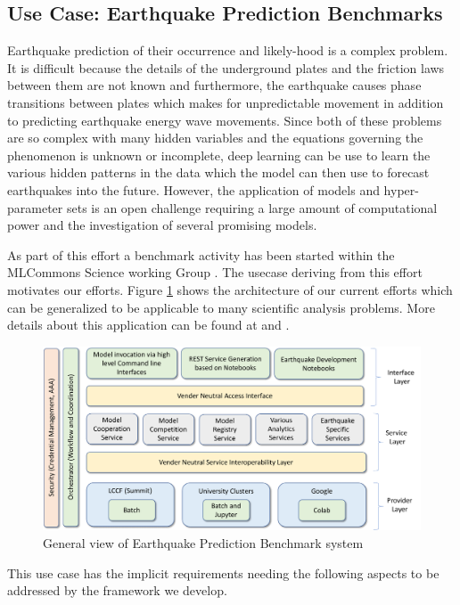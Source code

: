 \subsection{Use Case: Earthquake Prediction Benchmarks}


Earthquake prediction of their occurrence and likely-hood is a complex problem. 
It is difficult because the details of
the underground plates and the friction laws between them are not
known and furthermore, the earthquake causes phase transitions between
plates which makes for unpredictable movement in addition to 
predicting earthquake energy wave movements. 
Since both of these problems
are so complex with many hidden variables and the equations governing
the phenomenon is unknown or incomplete, deep learning can be use to
learn the various hidden patterns in the data which the model can then
use to forecast earthquakes into the future. \cite{fox2021earthquake}
However, the application of models and hyper-parameter sets is an open challenge requiring a large amount of computational power and the investigation of several promising models.

As part of this effort a benchmark activity has been started within the MLCommons Science working Group \cite{?}. The usecase deriving from this effort motivates our efforts. Figure \ref{fig:eq-general} shows the architecture of our current efforts which can be generalized to be applicable to many scientific analysis problems. More details about this application can be found at \cite{??} and \cite{??}.


\begin{figure}[htb]
\centering\includegraphics[width=1.0\columnwidth]{images/nist-eq-arch.pdf}
\caption{General view of Earthquake Prediction Benchmark system}
\label{fig:eq-general}
\end{figure}

This use case has the implicit requirements needing the following
aspects to be addressed by the framework we develop.

